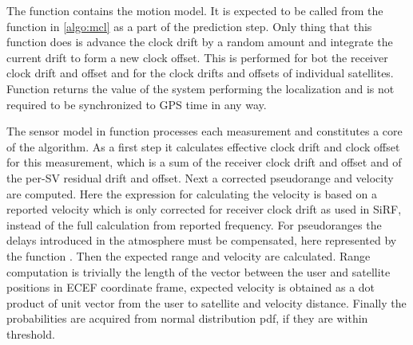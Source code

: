 The function \predictGPS{} contains the motion model.
It is expected to be called from the function \sampleFromActionModel{} in \cref{algo:mcl}
as a part of the prediction step.
Only thing that this function does is advance the clock drift by a random amount
and integrate the current drift to form a new clock offset.
This is performed for bot the receiver clock drift and offset and for the
clock drifts and offsets of individual satellites.
Function \timeFunc{} returns the value of the system performing the localization
and is not required to be synchronized to GPS time in any way.

The sensor model in function \observationProbabilityGPS{} processes each measurement
and constitutes a core of the algorithm.
As a first step it calculates effective clock drift and clock offset for this
measurement, which is a sum of the receiver clock drift and offset and of the 
per-SV residual drift and offset.
Next a corrected pseudorange and velocity are computed.
Here the expression for calculating the velocity is based on a reported velocity which
is only corrected for receiver clock drift as used in SiRF, instead of the full calculation from
reported frequency.
For pseudoranges the delays introduced in the atmosphere must be compensated,
here represented by the function \delays{}.
Then the expected range and velocity are calculated.
Range computation is trivially the length of the vector between the user and 
satellite positions in ECEF coordinate frame, expected velocity is obtained
as a dot product of unit vector from the user to satellite and velocity distance.
Finally the probabilities are acquired from normal distribution pdf, if they
are within threshold.

